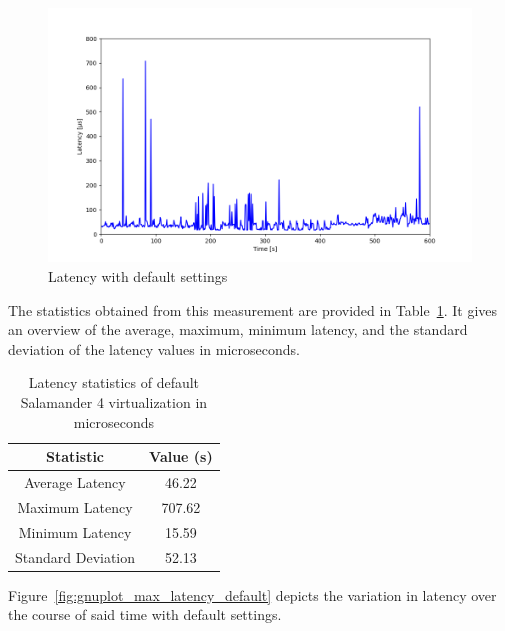 \documentclass[MMR,Master,english]{twbook}
\begin{document}
\begin{figure}[H]
	\centering
	\includegraphics[width=1.0\columnwidth]{img/max_latency_default.png}
	\caption[Latency with default settings]{Latency with default settings}
	\label{fig:max_latency_default}
\end{figure}

\noindent The statistics obtained from this measurement are provided in Table~\ref{tab:latency_statistics_virt}. It gives an overview of the average, maximum, minimum latency, and the standard deviation of the latency values in microseconds.

\begin{table}[H]
	\centering
	\caption{Latency statistics of default Salamander 4 virtualization in microseconds}
	\label{tab:latency_statistics_virt}
	\setlength{\tabcolsep}{0.5em} %
	{\renewcommand{\arraystretch}{1.2}%
		\begin{tabular}{|c|c|}\hline
			\textbf{Statistic} & \textbf{Value (\textmu s)} \\\hline
			Average Latency    & 46.22                      \\\hline
			Maximum Latency    & 707.62                     \\\hline
			Minimum Latency    & 15.59                      \\\hline
			Standard Deviation & 52.13                      \\\hline
		\end{tabular}}
\end{table}

\noindent Figure~\ref{fig:gnuplot_max_latency_default} depicts the variation in latency over the course of said time with default settings.
\end{document}
